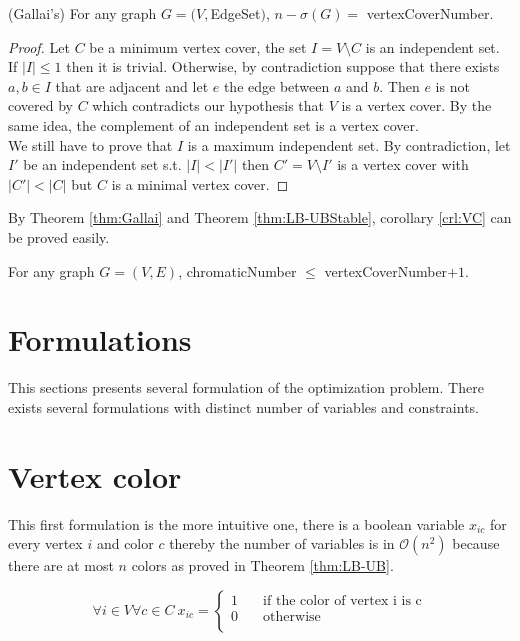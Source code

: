 \begin{thm}(Gallai's)
\label{thm:Gallai}
For any graph $G = (V,$\gls{EdgeSet}$)$, $n - \sigma(G) = $ \gls{vertexCoverNumber}.
\end{thm}

\begin{proof}
Let $C$ be a minimum vertex cover, the set $I = V \setminus C$ is an independent set. If $|I| \leq 1$ then it is trivial. Otherwise, by contradiction suppose that there exists $a,b \in I$ that are adjacent and let $e$ the edge between $a$ and $b$. Then $e$ is not covered by $C$ which contradicts our hypothesis that $V$ is a vertex cover. By the same idea, the complement of an independent set is a vertex cover.\\
We still have to prove that $I$ is a maximum independent set. By contradiction, let $I\prime$ be an independent set s.t. $|I| < |I\prime|$ then $C\prime = V \setminus I\prime$ is a vertex cover with $|C\prime| < |C|$ but $C$ is a minimal vertex cover.
\end{proof}

By Theorem \ref{thm:Gallai} and Theorem \ref{thm:LB-UBStable}, corollary \ref{crl:VC} can be proved easily.

\begin{corollary}
\label{crl:VC}
For any graph $G=(V,E)$, \gls{chromaticNumber} $ \leq $ \gls{vertexCoverNumber}$ + 1$.
\end{corollary}


\section{Formulations}
\label{sec:coloring_formulations}

This sections presents several formulation of the optimization problem. There exists several formulations with distinct number of variables and constraints.

\section{Vertex color}
\label{VC}
This first formulation is the more intuitive one, there is a boolean variable $x_{ic}$ for every vertex $i$ and color $c$ thereby the number of variables  is in $ \mathcal{O}(n^2)$ because there are at most $n$ colors as proved in Theorem \ref{thm:LB-UB}.

\[\forall i \in V \forall c \in C\  x_{ic} =
  \begin{cases}
    1       & \quad \text{if the color of vertex i is c}  \\
    0  & \quad \text{otherwise }\\
  \end{cases}
\]

